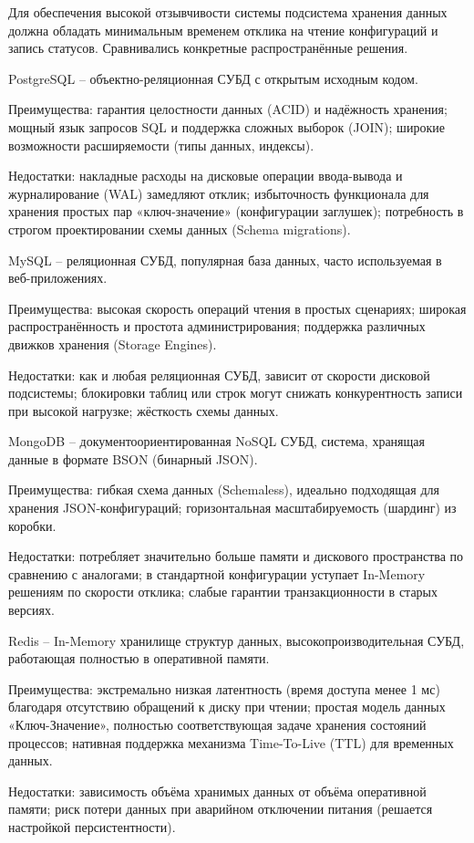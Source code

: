 Для обеспечения высокой отзывчивости системы подсистема хранения данных должна обладать минимальным временем отклика на чтение конфигураций и запись статусов. Сравнивались конкретные распространённые решения.

PostgreSQL -- объектно-реляционная СУБД с открытым исходным кодом.

Преимущества: гарантия целостности данных (ACID) и надёжность хранения; мощный язык запросов SQL и поддержка сложных выборок (JOIN); широкие возможности расширяемости (типы данных, индексы).

Недостатки: накладные расходы на дисковые операции ввода-вывода и журналирование (WAL) замедляют отклик; избыточность функционала для хранения простых пар «ключ-значение» (конфигурации заглушек); потребность в строгом проектировании схемы данных (Schema migrations).

MySQL -- реляционная СУБД, популярная база данных, часто используемая в веб-приложениях.

Преимущества: высокая скорость операций чтения в простых сценариях; широкая распространённость и простота администрирования; поддержка различных движков хранения (Storage Engines).

Недостатки: как и любая реляционная СУБД, зависит от скорости дисковой подсистемы; блокировки таблиц или строк могут снижать конкурентность записи при высокой нагрузке; жёсткость схемы данных.

MongoDB -- документоориентированная NoSQL СУБД, система, хранящая данные в формате BSON (бинарный JSON).

Преимущества: гибкая схема данных (Schemaless), идеально подходящая для хранения JSON-конфигураций; горизонтальная масштабируемость (шардинг) из коробки.

Недостатки: потребляет значительно больше памяти и дискового пространства по сравнению с аналогами; в стандартной конфигурации уступает In-Memory решениям по скорости отклика; слабые гарантии транзакционности в старых версиях.

Redis -- In-Memory хранилище структур данных, высокопроизводительная СУБД, работающая полностью в оперативной памяти.

Преимущества: экстремально низкая латентность (время доступа менее 1 мс) благодаря отсутствию обращений к диску при чтении; простая модель данных «Ключ-Значение», полностью соответствующая задаче хранения состояний процессов; нативная поддержка механизма Time-To-Live (TTL) для временных данных.

Недостатки: зависимость объёма хранимых данных от объёма оперативной памяти; риск потери данных при аварийном отключении питания (решается настройкой персистентности).

